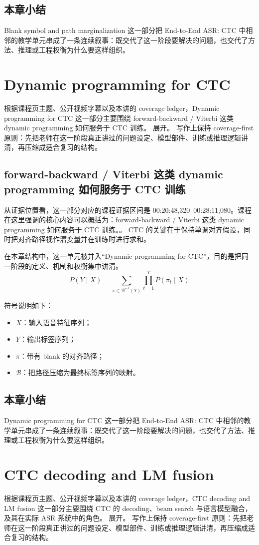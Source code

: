 \documentclass[a4paper]{article}
\begin{document}
\subsection{本章小结}
Blank symbol and path marginalization 这一部分把 End-to-End ASR: CTC 中相邻的教学单元串成了一条连续叙事：既交代了这一阶段要解决的问题，也交代了方法、推理或工程权衡为什么要这样组织。

\section{Dynamic programming for CTC}
根据课程页主题、公开视频字幕以及本讲的 coverage ledger，Dynamic programming for CTC 这一部分主要围绕 forward-backward / Viterbi 这类 dynamic programming 如何服务于 CTC 训练。 展开。
写作上保持 coverage-first 原则：先把老师在这一阶段真正讲过的问题设定、模型部件、训练或推理逻辑讲清，再压缩成适合复习的结构。

\subsection{forward-backward / Viterbi 这类 dynamic programming 如何服务于 CTC 训练}
从证据位置看，这一部分对应的课程证据区间是 00:20:48,320--00:28:11,080。课程在这里强调的核心内容可以概括为：forward-backward / Viterbi 这类 dynamic programming 如何服务于 CTC 训练。。
CTC 的关键在于保持单调对齐假设，同时把对齐路径视作潜变量并在训练时进行求和。

在本章结构中，这一单元被并入“Dynamic programming for CTC”，目的是把同一阶段的定义、机制和权衡集中讲清。
\[
P(Y \mid X) = \sum_{\pi \in \mathcal{B}^{-1}(Y)} \prod_{t=1}^{T} P(\pi_t \mid X)
\]

符号说明如下：
\begin{itemize}
\item $X$：输入语音特征序列；
\item $Y$：输出标签序列；
\item $\pi$：带有 blank 的对齐路径；
\item $\mathcal{B}$：把路径压缩为最终标签序列的映射。
\end{itemize}

\subsection{本章小结}
Dynamic programming for CTC 这一部分把 End-to-End ASR: CTC 中相邻的教学单元串成了一条连续叙事：既交代了这一阶段要解决的问题，也交代了方法、推理或工程权衡为什么要这样组织。

\section{CTC decoding and LM fusion}
根据课程页主题、公开视频字幕以及本讲的 coverage ledger，CTC decoding and LM fusion 这一部分主要围绕 CTC 的 decoding、beam search 与语言模型融合，及其在实际 ASR 系统中的角色。 展开。
写作上保持 coverage-first 原则：先把老师在这一阶段真正讲过的问题设定、模型部件、训练或推理逻辑讲清，再压缩成适合复习的结构。
\end{document}
